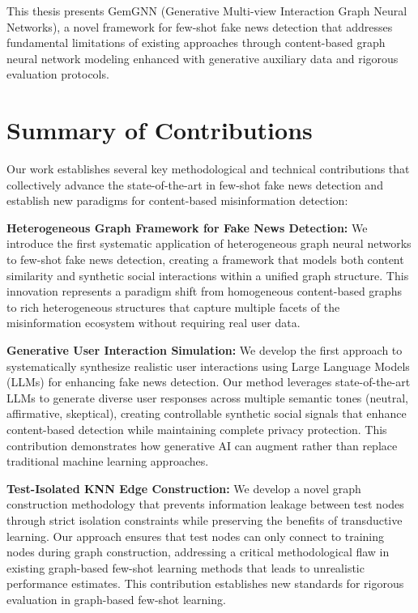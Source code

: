 
This thesis presents GemGNN (Generative Multi-view Interaction Graph Neural Networks), a novel framework for few-shot fake news detection that addresses fundamental limitations of existing approaches through content-based graph neural network modeling enhanced with generative auxiliary data and rigorous evaluation protocols.

\section{Summary of Contributions}

Our work establishes several key methodological and technical contributions that collectively advance the state-of-the-art in few-shot fake news detection and establish new paradigms for content-based misinformation detection:


\textbf{Heterogeneous Graph Framework for Fake News Detection:} We introduce the first systematic application of heterogeneous graph neural networks to few-shot fake news detection, creating a framework that models both content similarity and synthetic social interactions within a unified graph structure. This innovation represents a paradigm shift from homogeneous content-based graphs to rich heterogeneous structures that capture multiple facets of the misinformation ecosystem without requiring real user data.

\textbf{Generative User Interaction Simulation:} We develop the first approach to systematically synthesize realistic user interactions using Large Language Models (LLMs) for enhancing fake news detection. Our method leverages state-of-the-art LLMs to generate diverse user responses across multiple semantic tones (neutral, affirmative, skeptical), creating controllable synthetic social signals that enhance content-based detection while maintaining complete privacy protection. This contribution demonstrates how generative AI can augment rather than replace traditional machine learning approaches.


\textbf{Test-Isolated KNN Edge Construction:} We develop a novel graph construction methodology that prevents information leakage between test nodes through strict isolation constraints while preserving the benefits of transductive learning. Our approach ensures that test nodes can only connect to training nodes during graph construction, addressing a critical methodological flaw in existing graph-based few-shot learning methods that leads to unrealistic performance estimates. This contribution establishes new standards for rigorous evaluation in graph-based few-shot learning.

